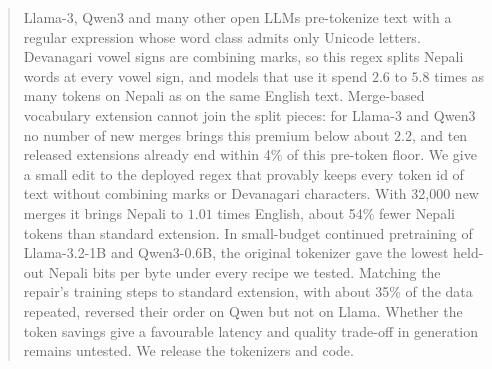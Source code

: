 \begin{abstract}
Llama-3, Qwen3 and many other open LLMs pre-tokenize text with a regular expression whose word class admits only Unicode letters. Devanagari vowel signs are combining marks, so this regex splits Nepali words at every vowel sign, and models that use it spend $2.6$ to $5.8$ times as many tokens on Nepali as on the same English text. Merge-based vocabulary extension cannot join the split pieces: for Llama-3 and Qwen3 no number of new merges brings this premium below about $2.2$, and ten released extensions already end within 4\% of this pre-token floor. We give a small edit to the deployed regex that provably keeps every token id of text without combining marks or Devanagari characters. With 32{,}000 new merges it brings Nepali to $1.01$ times English, about 54\% fewer Nepali tokens than standard extension. In small-budget continued pretraining of Llama-3.2-1B and Qwen3-0.6B, the original tokenizer gave the lowest held-out Nepali bits per byte under every recipe we tested. Matching the repair's training steps to standard extension, with about 35\% of the data repeated, reversed their order on Qwen but not on Llama. Whether the token savings give a favourable latency and quality trade-off in generation remains untested. We release the tokenizers and code.
\end{abstract}
